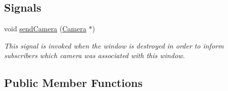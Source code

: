 \subsection*{Signals}
\begin{DoxyCompactItemize}
\item 
void \hyperlink{classVideoWindow_a726415adc7cbeb8ed1ac0892929ecfaf}{send\-Camera} (\hyperlink{classCamera}{Camera} $\ast$)
\begin{DoxyCompactList}\small\item\em This signal is invoked when the window is destroyed in order to inform subscribers which camera was associated with this window. \end{DoxyCompactList}\end{DoxyCompactItemize}
\subsection*{Public Member Functions}
